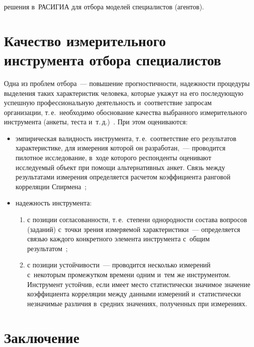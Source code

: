 \begin{multicols}{2}

\noindent
 решения в~РАСИГИА для отбора моделей специалистов (агентов).

\section{Качество измерительного инструмента отбора 
специалистов}

  Одна из проблем отбора~--- повышение прог\-но\-стич\-ности, на\-деж\-ности 
процедуры выделения таких характеристик человека, которые укажут на его 
по\-сле\-ду\-ющую успеш\-ную профессиональную дея\-тель\-ность и~соответствие 
запросам организации, т.\,е.\ необходимо обоснование качества вы\-бран\-но\-го 
измерительного инструмента (анкеты, тес\-та и~т.\,д.)~\cite{14-r, 28-r}. При этом 
оцениваются:
  \begin{itemize}
\item эмпирическая валидность инструмента, т.\,е.\ соответствие его 
результатов характеристике, для измерения которой он разработан,~--- 
проводится пилотное исследование, в~ходе которого респонденты оценивают 
ис\-сле\-ду\-емый объект при помощи альтернативных анкет. Связь между 
результатами измерения определяется расчетом коэффициента ранговой 
корреляции Спирмена~\cite{14-r};
\item надежность инструмента: 
\begin{enumerate}[(1)]
\item с позиции со\-гла\-со\-ван\-ности, т.\,е.\ степени 
однородности со\-ста\-ва вопросов (заданий) с~точ\-ки зрения из\-ме\-ря\-емой 
характеристики~--- определяется связью каждого конкретного элемента 
инструмента с~общим результатом~\cite{33-r}; 
\item с позиции устой\-чи\-вости~--- 
проводится несколько измерений с~некоторым промежутком времени одним 
и~тем же инструментом. Инструмент устойчив, если имеет мес\-то 
статистически значимое значение коэффициента корреляции между данными 
измерений и~статистически незначимые различия в~сред\-них значениях, 
полученных при измерениях.
\end{enumerate}
\end{itemize}

\vspace*{-6pt}

\section{Заключение}


\end{multicols}
